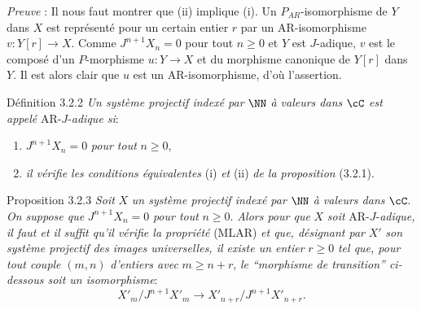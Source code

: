 \emph{Preuve} : Il nous faut montrer que (ii) implique (i). Un $P_{AR}$-isomorphisme de $Y$ dans $X$ est représenté pour un certain entier $r$ par un AR-isomorphisme $v:Y[r]\to X$. Comme $J^{n+1}X_n=0$ pour tout $n\ge0$ et $Y$ est $J$-adique, $v$ est le composé d'un $P$-morphisme $u:Y\to X$ et du morphisme canonique de $Y[r]$ dans $Y$. Il est alors clair que $u$ est un AR-isomorphisme, d'où l'assertion.

\begin{statement}{Définition 3.2.2}
\emph{Un système projectif indexé par} $\NN$ \emph{à valeurs dans} $\cC$ \emph{est appelé} AR-$J$-\emph{adique si}:
\begin{enumerate}[label=(\alph*)]
\item $J^{n+1}X_n=0$ \emph{pour tout} $n\ge0$,
\item \emph{il vérifie les conditions équivalentes} (i) \emph{et} (ii) \emph{de la proposition} (3.2.1).
\end{enumerate}
\end{statement}

\begin{statement}{Proposition 3.2.3}
\emph{Soit} $X$ \emph{un système projectif indexé par} $\NN$ \emph{à valeurs dans} $\cC$. \emph{On suppose que} $J^{n+1}X_n=0$ \emph{pour tout} $n\ge0$. \emph{Alors pour que} $X$ \emph{soit} AR-$J$-\emph{adique, il faut et il suffit qu'il vérifie la propriété} (MLAR) \emph{et que, désignant par} $X'$ \emph{son système projectif des images universelles, il existe un entier} $r\ge0$ \emph{tel que, pour tout couple} $(m,n)$ \emph{d'entiers avec} $m\ge n+r$, \emph{le ``morphisme de transition'' ci-dessous soit un isomorphisme}:
\[
X'_m/J^{n+1}X'_m\longrightarrow X'_{n+r}/J^{n+1}X'_{n+r}.
\]
\end{statement}

